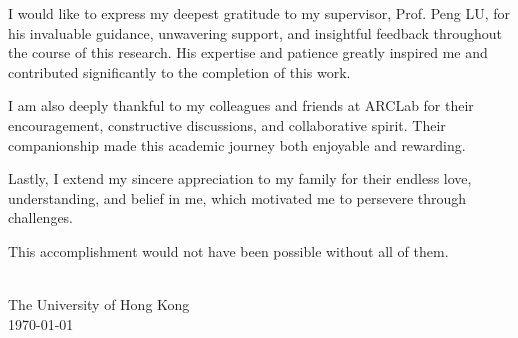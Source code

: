 \begin{acknowledgements}
\setcounter{page}{2}
\addchaptertocentry{\acknowledgementname} %
\vspace{1cm}


I would like to express my deepest gratitude to my supervisor, Prof. Peng LU, for his invaluable guidance, unwavering support, and insightful feedback throughout the course of this research. His expertise and patience greatly inspired me and contributed significantly to the completion of this work.

I am also deeply thankful to my colleagues and friends at ARCLab for their encouragement, constructive discussions, and collaborative spirit. Their companionship made this academic journey both enjoyable and rewarding.

Lastly, I extend my sincere appreciation to my family for their endless love, understanding, and belief in me, which motivated me to persevere through challenges.

This accomplishment would not have been possible without all of them.
\\[0.4cm]

\begin{flushright}
    \authorname \\
    The University of Hong Kong \\
    \usdate\today
\end{flushright}

\end{acknowledgements}